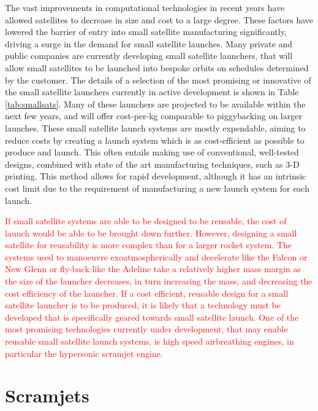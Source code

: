     
    The vast improvements in computational technologies in recent years have allowed satellites to decrease in size and cost to a large degree. These factors have lowered the barrier of entry into small satellite manufacturing significantly, driving a surge in the demand for small satellite launches. Many private and public companies are currently developing small satellite launchers, that will allow small satellites to be launched into bespoke orbits on schedules determined by the customer\cite{Faa2018}. The details of a selection of the most promising or innovative of the small satellite launchers currently in active development is shown in Table \ref{tab:smallsats}. Many of these launchers are projected to be available within the next few years, and will offer cost-per-kg comparable to piggybacking on larger launches.
    These small satellite launch systems are mostly expendable, aiming to reduce costs by creating a launch system which is as cost-efficient as possible to produce and launch\cite{Niederstrasser2015}. This often entails making use of conventional, well-tested designs, combined with state of the art manufacturing techniques, such as 3-D printing\cite{Niederstrasser2015,Gilmour}. This method allows for rapid development, although it has an intrinsic cost limit due to the requirement of manufacturing a new launch system for each launch. 
    
    \textcolor{red}{If small satellite systems are able to be designed to be reusable, the cost of launch would be able to be brought down further. However, designing a small satellite for reusability is more complex than for a larger rocket system. The systems used to manoeuvre exoatmospherically and decelerate like the Falcon or New Glenn or fly-back like the Adeline take a relatively higher mass margin as the size of the launcher decreases, in turn increasing the mass, and decreasing the cost efficiency of the launcher. If a cost efficient, reusable design for a small satellite launcher is to be produced, it is likely that a technology must be developed that is specifically geared towards small satellite launch. 
    One of the most promising technologies currently under development, that may enable reusable small satellite launch systems, is high speed airbreathing engines\cite{Smart2009}, in particular the hypersonic scramjet engine.}
    
 
    
    \section{Scramjets}
    
